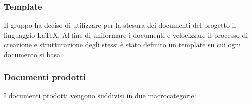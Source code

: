 \subsubsection{Template}
\label{ssub:template}

Il gruppo ha deciso di utilizzare per la stesura dei documenti del progetto il linguaggio \LaTeX. Al fine di
uniformare i documenti e velocizzare il processo di creazione e strutturazione degli stessi è stato definito un
template su cui ogni documento si basa.

\subsubsection{Documenti prodotti}
\label{ssub:documenti_prodotti}

I documenti prodotti vengono suddivisi in due macrocategorie:
